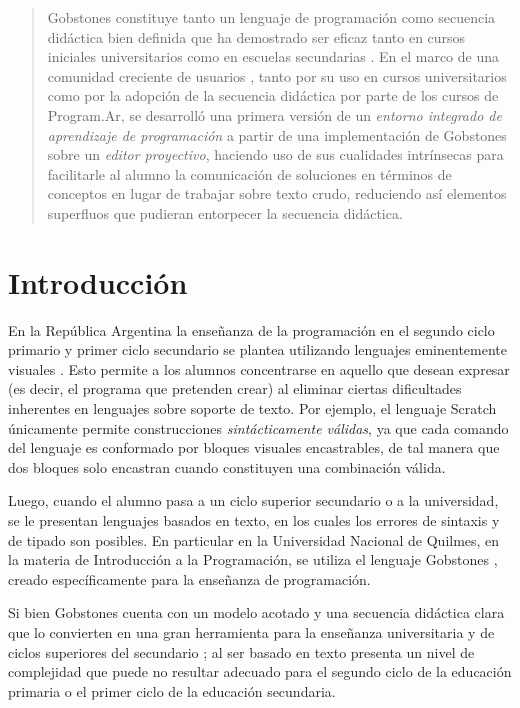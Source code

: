 \begin{abstract}
Gobstones constituye tanto un lenguaje de programación como secuencia didáctica bien definida que ha demostrado ser eficaz tanto en cursos iniciales universitarios como en escuelas secundarias \cite{CuadernoDocenteProgramAR}. En el marco de una comunidad creciente de usuarios \cite{CuadernoDocenteProgramAR}, tanto por su uso en cursos universitarios como por la adopción de la secuencia didáctica por parte de los cursos de Program.Ar, se desarrolló una primera versión de un \emph{entorno integrado de aprendizaje de programación} a partir de una implementación de Gobstones sobre un \emph{editor proyectivo}, haciendo uso de sus cualidades intrínsecas para facilitarle al alumno la comunicación de soluciones en términos de conceptos en lugar de trabajar sobre texto crudo, reduciendo así elementos superfluos que pudieran entorpecer la secuencia didáctica.
\end{abstract}



\section{Introducción} \label{intro}

En la República Argentina la enseñanza de la programación en el segundo ciclo primario y primer ciclo secundario se plantea utilizando lenguajes eminentemente visuales \cite{CuadernoDocenteProgramAR}. Esto permite a los alumnos concentrarse en aquello que desean expresar (es decir, el programa que pretenden crear) al eliminar ciertas dificultades inherentes en lenguajes sobre soporte de texto. Por ejemplo, el lenguaje Scratch \cite{scratch}\cite{Maloney_scratch} únicamente permite construcciones \textit{sintácticamente válidas}, ya que cada comando del lenguaje es conformado por bloques visuales encastrables, de tal manera que dos bloques solo encastran cuando constituyen una combinación válida.

Luego, cuando el alumno pasa a un ciclo superior secundario o a la universidad, se le presentan lenguajes basados en texto, en los cuales los errores de sintaxis y de tipado son posibles. En particular en la Universidad Nacional de Quilmes, en la materia de Introducción a la Programación, se utiliza el lenguaje Gobstones \cite{Gobstones}, creado específicamente para la enseñanza de programación.

Si bien Gobstones cuenta con un modelo acotado y una secuencia didáctica clara que lo convierten en una gran herramienta para la enseñanza universitaria y de ciclos superiores del secundario \cite{gobstonesEsImportante}; al ser basado en texto presenta un nivel de complejidad que puede no resultar adecuado para el segundo ciclo de la educación primaria o el primer ciclo de la educación secundaria.

